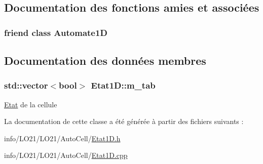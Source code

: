 \subsection{Documentation des fonctions amies et associées}
\subsubsection[{\texorpdfstring{Automate1D}{Automate1D}}]{\setlength{\rightskip}{0pt plus 5cm}friend class {\bf Automate1D}\hspace{0.3cm}{\ttfamily [friend]}}\hypertarget{class_etat1_d_a7b442c5e6a2ad84fcc725706d1f77dfe}{}\label{class_etat1_d_a7b442c5e6a2ad84fcc725706d1f77dfe}


\subsection{Documentation des données membres}
\subsubsection[{\texorpdfstring{m\+\_\+tab}{m_tab}}]{\setlength{\rightskip}{0pt plus 5cm}std\+::vector$<$bool$>$ Etat1\+D\+::m\+\_\+tab\hspace{0.3cm}{\ttfamily [protected]}}\hypertarget{class_etat1_d_a07068969d6d83e95a8d04363914adf33}{}\label{class_etat1_d_a07068969d6d83e95a8d04363914adf33}
\hyperlink{class_etat}{Etat} de la cellule 

La documentation de cette classe a été générée à partir des fichiers suivants \+:\begin{DoxyCompactItemize}
\item 
info/\+L\+O21/\+L\+O21/\+Auto\+Cell/\hyperlink{_etat1_d_8h}{Etat1\+D.\+h}\item 
info/\+L\+O21/\+L\+O21/\+Auto\+Cell/\hyperlink{_etat1_d_8cpp}{Etat1\+D.\+cpp}\end{DoxyCompactItemize}
